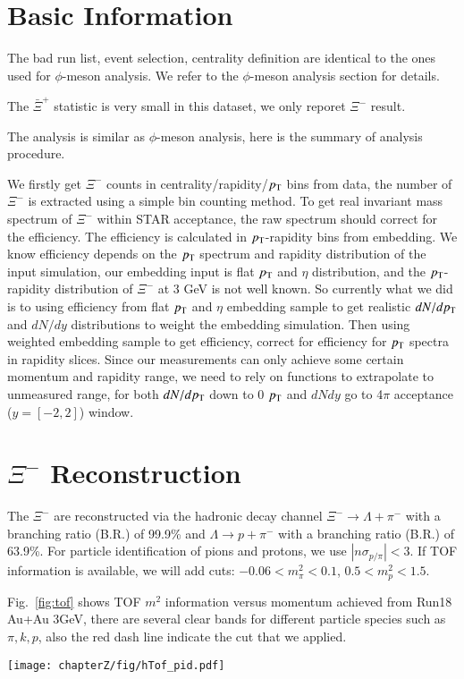 \section{Basic Information}
The bad run list, event selection, centrality definition are identical to the ones used for $\phi$-meson analysis. We refer to the $\phi$-meson analysis section for details.

The $\bar{\Xi}^{+}$ statistic is very small in this dataset, we only reporet $\Xi^{-}$ result.

The analysis is similar as $\phi$-meson analysis, here is the summary of analysis procedure.

We firstly get $\Xi^{-}$ counts in centrality/rapidity/$p_{\rm T}$ bins from data, the number of $\Xi^{-}$ is extracted using a simple bin counting method. To get real invariant mass spectrum of $\Xi^{-}$ within STAR acceptance, the raw spectrum should correct for the efficiency. The efficiency is calculated in $p_{\rm T}$-rapidity bins from embedding. We know efficiency depends on the $p_{\rm T}$ spectrum and rapidity distribution of the input simulation, our embedding input is flat $p_{\rm T}$ and $\eta$ distribution, and the $p_{\rm T}$-rapidity distribution of $\Xi^{-}$ at 3 GeV is not well known. So currently what we did is to using efficiency from flat $p_{\rm T}$ and $\eta$ embedding sample to get realistic $dN/dp_{\rm T}$ and $dN/dy$ distributions to weight the embedding simulation. Then using weighted embedding sample to get efficiency, correct for efficiency for $p_{\rm T}$ spectra in rapidity slices. Since our measurements can only achieve some certain momentum and rapidity range, we need to rely on functions to extrapolate to unmeasured range, for both $dN/dp_{\rm T}$ down to 0 $p_{\rm T}$ and $dNdy$ go to 4$\pi$ acceptance ($y=[-2, 2]$) window.

\section{$\Xi^{-}$ Reconstruction}
The $\Xi^{-}$ are reconstructed via the hadronic decay channel $\Xi^{-}\rightarrow \Lambda+\pi^{-}$ with a branching ratio (B.R.) of 99.9\% and $\Lambda\rightarrow p+\pi^{-}$ with a branching ratio (B.R.) of 63.9\%. For particle identification of pions and protons, we use $|n\sigma_{p/\pi}|<3$. If TOF information is available, we will add cuts: $-0.06<m^2_{\pi}<0.1$, $0.5<m^2_{p}<1.5$.

Fig.~\ref{fig:tof} shows TOF $m^2$ information versus momentum achieved from Run18 Au+Au 3GeV, there are several clear bands for different particle species such as $\pi, k, p$, also the red dash line indicate the cut that we applied.
\begin{figure*}[hbt!]
\texttt{[image: chapterZ/fig/hTof\_pid.pdf]}
\caption{TOF $m^2$ versus momentum achieved from Run18 Au+Au 3GeV.}
\label{fig:tof}
\end{figure*}

